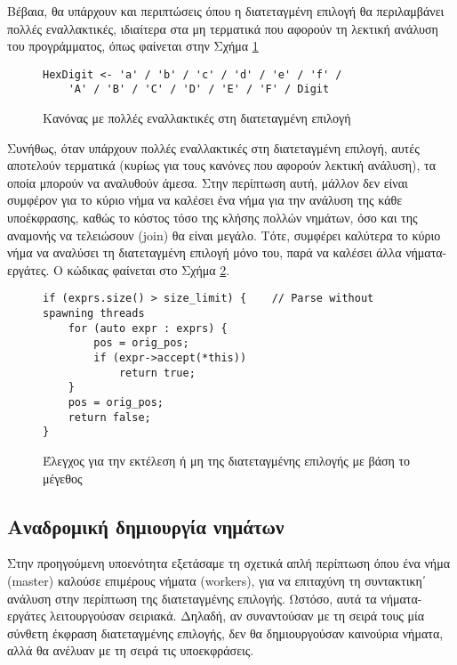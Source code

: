 
Βέβαια, θα υπάρχουν και περιπτώσεις όπου η διατεταγμένη επιλογή θα περιλαμβάνει πολλές εναλλακτικές, ιδιαίτερα στα μη τερματικά που αφορούν τη λεκτική ανάλυση του προγράμματος, όπως φαίνεται στην Σχήμα \ref{fig:top_down_4}

\begin{figure}[h]
\begin{Verbatim}
HexDigit <- 'a' / 'b' / 'c' / 'd' / 'e' / 'f' / 
    'A' / 'B' / 'C' / 'D' / 'E' / 'F' / Digit
\end{Verbatim}
\caption{Κανόνας με πολλές εναλλακτικές στη διατεταγμένη επιλογή}
\label{fig:top_down_4}
\end{figure}


Συνήθως, όταν υπάρχουν πολλές εναλλακτικές στη διατεταγμένη επιλογή, αυτές αποτελούν τερματικά (κυρίως για τους κανόνες που αφορούν λεκτική ανάλυση), τα οποία μπορούν να αναλυθούν άμεσα. 
Στην περίπτωση αυτή, μάλλον δεν είναι συμφέρον για το κύριο νήμα να καλέσει ένα νήμα για την ανάλυση της κάθε υποέκφρασης, καθώς το κόστος τόσο της κλήσης πολλών νημάτων, όσο και της αναμονής να τελειώσουν (join) θα είναι μεγάλο.
Τότε, συμφέρει καλύτερα το κύριο νήμα να αναλύσει τη διατεταγμένη επιλογή μόνο του, παρά να καλέσει άλλα νήματα-εργάτες. 
Ο κώδικας φαίνεται στο Σχήμα \ref{fig:expr_size}.

\begin{figure}[h]
\setlength\partopsep{-\topsep}%
\begin{verbatim}
if (exprs.size() > size_limit) {    // Parse without spawning threads
    for (auto expr : exprs) {
        pos = orig_pos;
        if (expr->accept(*this))
            return true;
    }
    pos = orig_pos;
    return false;
}
\end{verbatim}
\caption{Έλεγχος για την εκτέλεση ή μη της διατεταγμένης επιλογής με βάση το μέγεθος}
\label{fig:expr_size}
\end{figure}

\subsection{Αναδρομική δημιουργία νημάτων}

Στην προηγούμενη υποενότητα εξετάσαμε τη σχετικά απλή περίπτωση όπου ένα νήμα (master) καλούσε επιμέρους νήματα (workers), για να επιταχύνη τη συντακτικη΄ ανάλυση στην περίπτωση της διατεταγμένης επιλογής.
Ωστόσο, αυτά τα νήματα-εργάτες λειτουργούσαν σειριακά.
Δηλαδή, αν συναντούσαν με τη σειρά τους μία σύνθετη έκφραση διατεταγμένης επιλογής, δεν θα δημιουργούσαν καινούρια νήματα, αλλά θα ανέλυαν με τη σειρά τις υποεκφράσεις.


